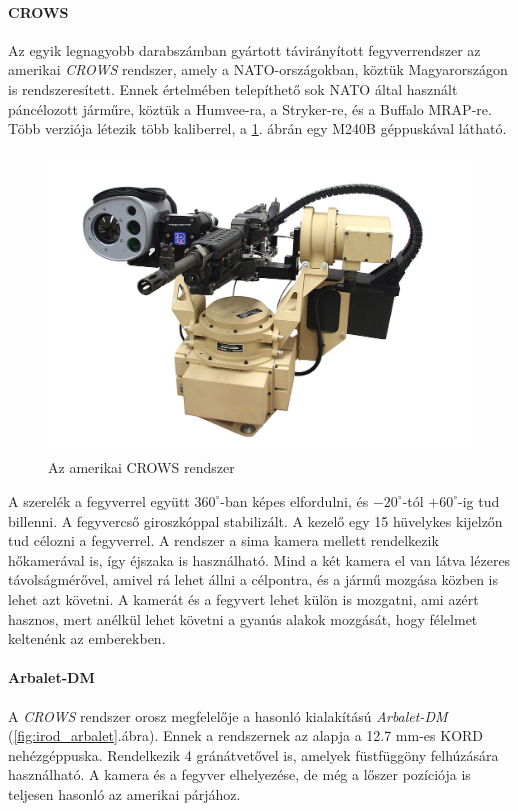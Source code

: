 \documentclass[12pt,a4paper]{article}
\begin{document}
\paragraph{CROWS \cite{crows}}
Az egyik legnagyobb darabszámban gyártott távirányított fegyverrendszer az amerikai \textsl{CROWS} rendszer, amely a NATO-országokban, köztük Magyarországon is rendszeresített. Ennek értelmében telepíthető sok NATO által használt páncélozott járműre, köztük a Humvee-ra, a Stryker-re, és a Buffalo MRAP-re. Több verziója létezik több kaliberrel, a \ref{fig:irod_crows}. ábrán egy M240B géppuskával látható.\\

\begin{figure}[h!]
	\centering
	\includegraphics[width=1\linewidth]{irod_crows}
	\caption{Az amerikai CROWS rendszer \cite{crows}}
	\label{fig:irod_crows}
\end{figure}

A szerelék a fegyverrel együtt $360^\circ$-ban képes elfordulni, és $-20^{\circ}$-tól $+60^{\circ}$-ig tud billenni. A fegyvercső giroszkóppal stabilizált. A kezelő egy 15 hüvelykes kijelzőn tud célozni a fegyverrel. A rendszer a sima kamera mellett rendelkezik hőkamerával is, így éjszaka is használható. Mind a két kamera el van látva lézeres távolságmérővel, amivel rá lehet állni a célpontra, és a jármű mozgása közben is lehet azt követni. A kamerát és a fegyvert lehet külön is mozgatni, ami azért hasznos, mert anélkül lehet követni a gyanús alakok mozgását, hogy félelmet keltenénk az emberekben.

\paragraph{Arbalet-DM \cite{arbalet}}
A \textsl{CROWS} rendszer orosz megfelelője a hasonló kialakítású \textsl{Arbalet-DM} (\ref{fig:irod_arbalet}.ábra). Ennek a rendszernek az alapja a 12.7 mm-es KORD nehézgéppuska. Rendelkezik 4 gránátvetővel is, amelyek füstfüggöny felhúzására használható. A kamera és a fegyver elhelyezése, de még a lőszer pozíciója is teljesen hasonló az amerikai párjához.
\end{document}
